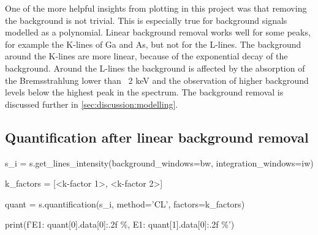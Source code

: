 One of the more helpful insights from plotting in this project was that removing the background is not trivial.
This is especially true for background signals modelled as a polynomial.
Linear background removal works well for some peaks, for example the K-lines of Ga and As, but not for the L-lines.
The background around the K-lines are more linear, because of the exponential decay of the background.
Around the L-lines the background is affected by the absorption of the Bremsstrahlung lower than ~2 keV and the observation of higher background levels below the highest peak in the spectrum.
The background removal is discussed further in \cref{sec:discussion:modelling}.








\subsection{Quantification after linear background removal}
\label{sec:discussion:steps:quantification:linear}





\begin{lcverbatim}
    s_i = s.get_lines_intensity(background_windows=bw, integration_windows=iw)

    k_factors = [<k-factor 1>, <k-factor 2>]

    quant = s.quantification(s_i, method='CL', factors=k_factors)

    print(f'E1: {quant[0].data[0]:.2f} \%, E1: {quant[1].data[0]:.2f} \%')
\end{lcverbatim}

